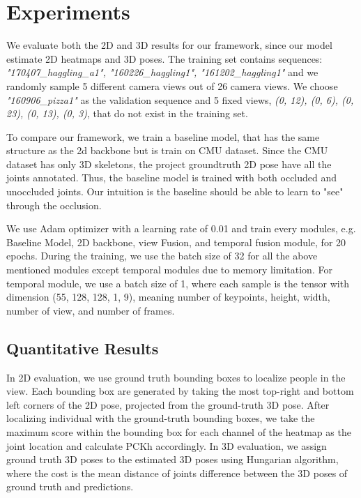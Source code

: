 
\chapter{Experiments}\label{chapter:introduction}
We evaluate both the 2D and 3D results for our framework, since our model estimate 2D heatmaps and 3D poses. The training set contains sequences: \textit{"170407\_haggling\_a1", "160226\_haggling1", "161202\_haggling1"} and we randomly sample 5 different camera views out of 26 camera views. We choose \textit{"160906\_pizza1"} as the validation sequence and 5 fixed views, \textit{(0, 12), (0, 6), (0, 23), (0, 13), (0, 3)}, that do not exist in the training set.

To compare our framework, we train a baseline model, that has the same structure as the 2d backbone but is train on CMU dataset. Since the CMU dataset has only 3D skeletons, the project groundtruth 2D pose have all the joints annotated. Thus, the baseline model is trained with both occluded and unoccluded joints. Our intuition is the baseline should be able to learn to "see" through the occlusion.

We use Adam optimizer with a learning rate of 0.01 and train every modules, e.g. Baseline Model, 2D backbone, view Fusion, and temporal fusion module, for 20 epochs. During the training, we use the batch size of 32 for all the above mentioned modules except temporal modules due to memory limitation. For temporal module, we use a batch size of 1, where each sample is the tensor with dimension (55, 128, 128, 1, 9), meaning number of keypoints, height, width, number of view, and number of frames.
\section{Quantitative Results}
In 2D evaluation, we use ground truth bounding boxes to localize people in the view. Each bounding box are generated by taking the most top-right and bottom left corners of the 2D pose, projected from the ground-truth 3D pose. After localizing individual with the ground-truth bounding boxes, we take the maximum score within the bounding box for each channel of the heatmap as the joint location and calculate PCKh accordingly.
In 3D evaluation, we assign ground truth 3D poses to the estimated 3D poses using Hungarian algorithm, where the cost is the mean distance of joints difference between the 3D poses of ground truth and predictions. 

